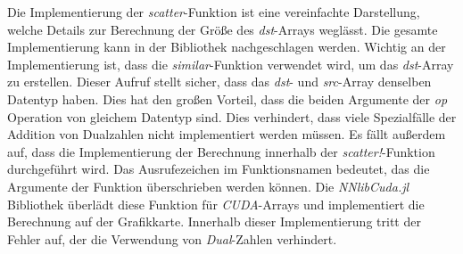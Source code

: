 Die Implementierung der \textit{scatter}-Funktion ist eine vereinfachte Darstellung, 
welche Details zur Berechnung der Größe des \textit{dst}-Arrays weglässt.
Die gesamte Implementierung kann in der  Bibliothek \cite{nnlib} nachgeschlagen werden.
Wichtig an der Implementierung ist, dass die \textit{similar}-Funktion verwendet wird, um das
\textit{dst}-Array zu erstellen.
Dieser Aufruf stellt sicher, dass das \textit{dst}- und \textit{src}-Array denselben Datentyp haben.
Dies hat den großen Vorteil, 
dass die beiden Argumente der \textit{op} Operation von gleichem Datentyp sind.
Dies verhindert, 
dass viele Spezialfälle der Addition von Dualzahlen nicht implementiert werden müssen.
Es fällt außerdem auf, dass die Implementierung der Berechnung innerhalb der \textit{scatter!}-Funktion
durchgeführt wird.
Das Ausrufezeichen im Funktionsnamen bedeutet, das die Argumente der Funktion überschrieben werden können.
Die \textit{NNlibCuda.jl} \cite{nnlibcuda} Bibliothek überlädt diese Funktion für \textit{CUDA}-Arrays und
implementiert die Berechnung auf der Grafikkarte.
Innerhalb dieser Implementierung tritt der Fehler auf, der die Verwendung von \textit{Dual}-Zahlen
verhindert.